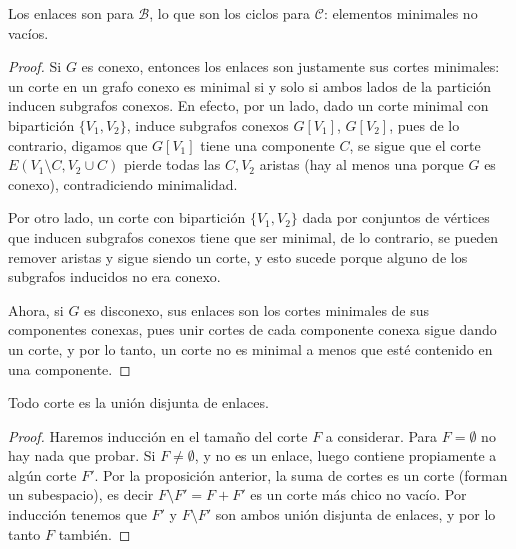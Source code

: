 \documentclass[../main.tex]{subfiles}
\begin{document}
\begin{obs}
Los enlaces son para $\mathcal B$, lo que son los ciclos para $\mathcal C$: elementos minimales no vacíos.
\end{obs}
\begin{proof}
Si $G$ es conexo, entonces los enlaces son justamente sus cortes minimales: un corte en un grafo conexo es minimal si y solo si ambos lados de la partición inducen subgrafos conexos. En efecto, por un lado, dado un corte minimal con bipartición $\{V_1,V_2\}$, induce subgrafos conexos $G[V_1]$, $G[V_2]$, pues de lo contrario, digamos que $G[V_1]$ tiene una componente $C$, se sigue que el corte $E(V_1 \setminus C, V_2 \cup C)$ pierde todas las $C,V_2$ aristas (hay al menos una porque $G$ es conexo), contradiciendo minimalidad.

 Por otro lado, un corte con bipartición $\{V_1,V_2\}$ dada por conjuntos de vértices que inducen subgrafos conexos tiene que ser minimal, de lo contrario, se pueden remover aristas y sigue siendo un corte, y esto sucede porque alguno de los subgrafos inducidos no era conexo.

 Ahora, si $G$ es disconexo, sus enlaces son los cortes minimales de sus componentes conexas, pues unir cortes de cada componente conexa sigue dando un corte, y por lo tanto, un corte no es minimal a menos que esté contenido en una componente.
\end{proof}

\begin{lemma}
Todo corte es la unión disjunta de enlaces.
\end{lemma}
\begin{proof}
Haremos inducción en el tamaño del corte $F$ a considerar. Para $F = \emptyset$ no hay nada que probar. Si $F \neq \emptyset$, y no es un enlace, luego contiene propiamente a algún corte $F'$. Por la proposición anterior, la suma de cortes es un corte (forman un subespacio), es decir $F \setminus F' = F + F'$ es un corte más chico no vacío. Por inducción tenemos que $F'$ y $F \setminus F'$ son ambos unión disjunta de enlaces, y por lo tanto $F$ también.
\end{proof}
\end{document}

